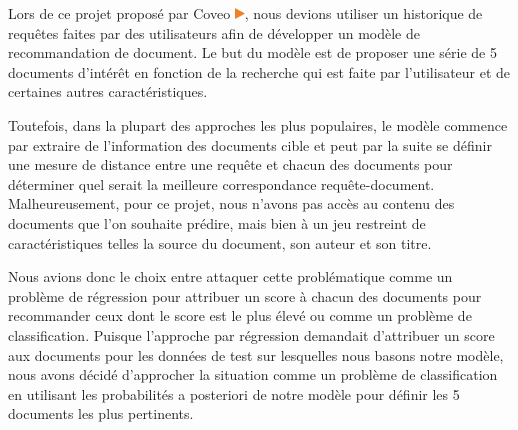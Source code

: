 Lors de ce projet proposé par Coveo \href{https://www.coveo.com/fr}{\includegraphics[height=0.3cm]{coveo_logo}}, nous devions utiliser un historique de requêtes faites par des utilisateurs afin de développer un modèle de recommandation de document. 
Le but du modèle est de proposer une série de 5 documents d'intérêt en fonction de la recherche qui est faite par l'utilisateur et de certaines autres caractéristiques.


Toutefois, dans la plupart des approches les plus populaires, le modèle commence par extraire de l'information des documents cible et peut par la suite se définir une mesure de distance entre une requête et chacun des documents pour déterminer quel serait la meilleure correspondance requête-document. 
Malheureusement, pour ce projet, nous n'avons pas accès au contenu des documents que l'on souhaite prédire, mais bien à un jeu restreint de caractéristiques telles la source du document, son auteur et son titre.

Nous avions donc le choix entre attaquer cette problématique comme un problème de régression pour attribuer un score à chacun des documents pour recommander ceux dont le score est le plus élevé ou comme un problème de classification.
Puisque l'approche par régression demandait d'attribuer un score aux documents pour les données de test sur lesquelles nous basons notre modèle, nous avons décidé d'approcher la situation comme un problème de classification en utilisant les probabilités a posteriori de notre modèle pour définir les 5 documents les plus pertinents.